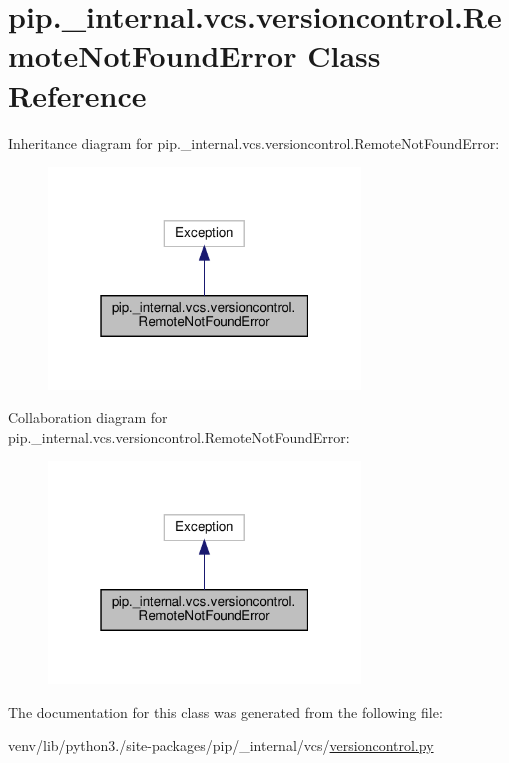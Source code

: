 \hypertarget{classpip_1_1__internal_1_1vcs_1_1versioncontrol_1_1RemoteNotFoundError}{}\section{pip.\+\_\+internal.\+vcs.\+versioncontrol.\+Remote\+Not\+Found\+Error Class Reference}
\label{classpip_1_1__internal_1_1vcs_1_1versioncontrol_1_1RemoteNotFoundError}


Inheritance diagram for pip.\+\_\+internal.\+vcs.\+versioncontrol.\+Remote\+Not\+Found\+Error\+:
\nopagebreak
\begin{figure}[H]
\begin{center}
\leavevmode
\includegraphics[width=235pt]{classpip_1_1__internal_1_1vcs_1_1versioncontrol_1_1RemoteNotFoundError__inherit__graph}
\end{center}
\end{figure}


Collaboration diagram for pip.\+\_\+internal.\+vcs.\+versioncontrol.\+Remote\+Not\+Found\+Error\+:
\nopagebreak
\begin{figure}[H]
\begin{center}
\leavevmode
\includegraphics[width=235pt]{classpip_1_1__internal_1_1vcs_1_1versioncontrol_1_1RemoteNotFoundError__coll__graph}
\end{center}
\end{figure}


The documentation for this class was generated from the following file\+:\begin{DoxyCompactItemize}
\item 
venv/lib/python3./site-\/packages/pip/\+\_\+internal/vcs/\hyperlink{versioncontrol_8py}{versioncontrol.\+py}\end{DoxyCompactItemize}
